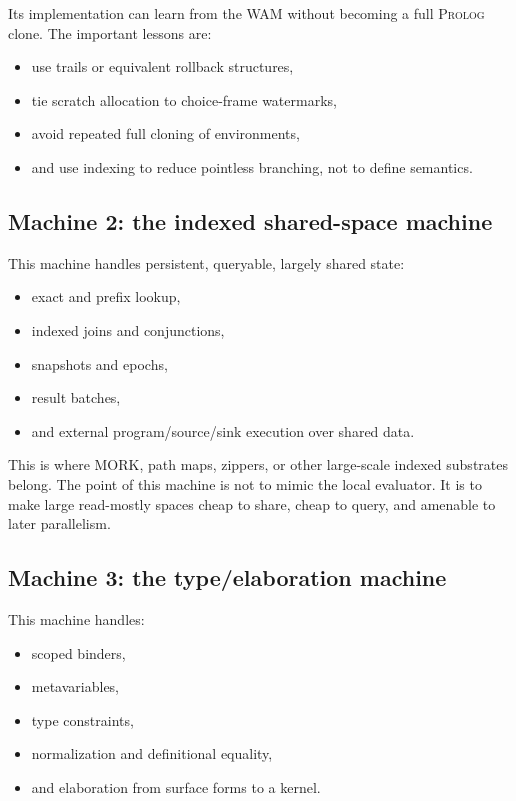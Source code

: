 \documentclass[11pt]{article}
\newcommand{\mork}{\textsc{MORK}}
\newcommand{\prolog}{\textsc{Prolog}}
\newcommand{\wam}{\textsc{WAM}}
\begin{document}
Its implementation can learn from the \wam{} without becoming a full \prolog{} clone. The important lessons are:
\begin{itemize}[leftmargin=2em]
  \item use trails or equivalent rollback structures,
  \item tie scratch allocation to choice-frame watermarks,
  \item avoid repeated full cloning of environments,
  \item and use indexing to reduce pointless branching, not to define semantics.
\end{itemize}

\subsection{Machine 2: the indexed shared-space machine}

This machine handles persistent, queryable, largely shared state:
\begin{itemize}[leftmargin=2em]
  \item exact and prefix lookup,
  \item indexed joins and conjunctions,
  \item snapshots and epochs,
  \item result batches,
  \item and external program/source/sink execution over shared data.
\end{itemize}

This is where \mork{}, path maps, zippers, or other large-scale indexed substrates belong. The point of this machine is not to mimic the local evaluator. It is to make large read-mostly spaces cheap to share, cheap to query, and amenable to later parallelism.

\subsection{Machine 3: the type/elaboration machine}

This machine handles:
\begin{itemize}[leftmargin=2em]
  \item scoped binders,
  \item metavariables,
  \item type constraints,
  \item normalization and definitional equality,
  \item and elaboration from surface forms to a kernel.
\end{itemize}
\end{document}
